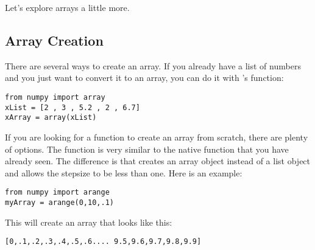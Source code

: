 Let's explore arrays a little more.

\subsection*{Array Creation}
There are several ways to create an array.  If you already have a list
of numbers and you just want to convert it to an array, you can do it
with 's  function:
\begin{Verbatim}
from numpy import array
xList = [2 , 3 , 5.2 , 2 , 6.7]
xArray = array(xList)
\end{Verbatim}
If you are looking for a function to create an array from scratch,
there are plenty of options.  The function  is very similar to
the native  function that you have already seen.  The
difference is that  creates an array object instead of
a list object and  allows the stepsize to be less than
one.  Here is an example:
\begin{Verbatim}
from numpy import arange
myArray = arange(0,10,.1)
\end{Verbatim}
This will create an array that looks like this:
\begin{Verbatim}
[0,.1,.2,.3,.4,.5,.6.... 9.5,9.6,9.7,9.8,9.9]
\end{Verbatim}
